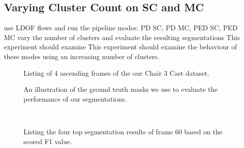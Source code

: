 \subsection{Varying Cluster Count on SC and MC}
use LDOF flows and run the pipeline modes: PD SC, PD MC, PED SC, PED MC
vary the number of clusters and evaluate the resulting segmentations
This experiment should examine 
This experiment should examine the behaviour of these modes using an increasing number of clusters.


\begin{figure}[H]
\begin{center}
\end{center}
\caption[Chair 3 Cast Dataset]{Listing of 4 ascending frames of the our Chair 3 Cast dataset.}
\label{fig:chair_3_cast_dataset}
\end{figure}

\begin{figure}[H]
\begin{center}

\end{center}
\caption[Chair 3 Cast Masks]{An illustration of the ground truth masks we use to evaluate the performance of our segmentations.}
\label{fig:chair_3_cast_masks}
\end{figure}

\begin{figure}[H]
\begin{center}

~
\end{center}
\caption[Chair 3 Cast Winner]{Listing the four top segmentation results of frame 60 based on the scored F1 value.}
\label{fig:chair_3_cast_best_f_score_results}
\end{figure}

